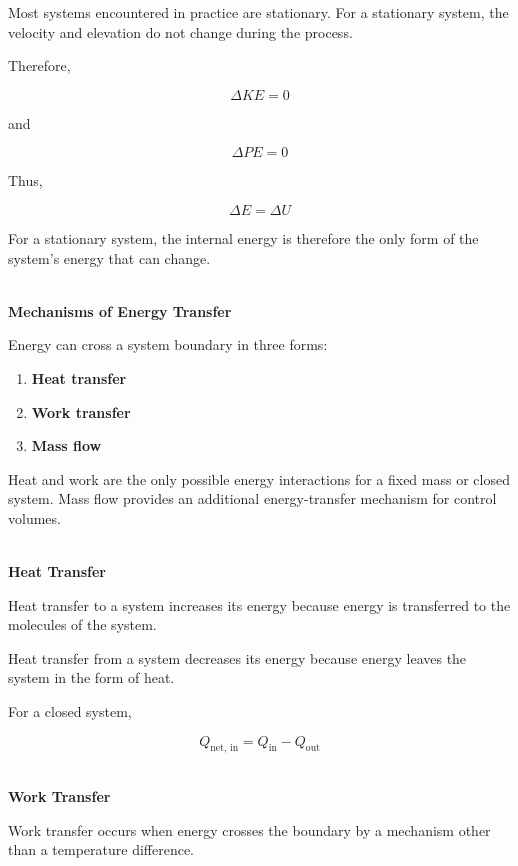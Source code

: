 \documentclass[12pt]{article}
\begin{document}
Most systems encountered in practice are stationary. For a stationary system, the velocity and elevation do not change during the process.

Therefore,

\begin{equation*}
\Delta KE=0
\end{equation*}

and

\begin{equation*}
\Delta PE=0
\end{equation*}

Thus,

\begin{equation*}
\Delta E=\Delta U
\end{equation*}

For a stationary system, the internal energy is therefore the only form of the system's energy that can change. 

\textbf{\\ Mechanisms of Energy Transfer}

Energy can cross a system boundary in three forms:

\begin{enumerate}
    \item \textbf{Heat transfer}
    \item \textbf{Work transfer}
    \item \textbf{Mass flow}
\end{enumerate}

Heat and work are the only possible energy interactions for a fixed mass or closed system. Mass flow provides an additional energy-transfer mechanism for control volumes. 

\textbf{\\ Heat Transfer}

Heat transfer to a system increases its energy because energy is transferred to the molecules of the system.

Heat transfer from a system decreases its energy because energy leaves the system in the form of heat.

For a closed system,

\begin{equation*}
Q_{\mathrm{net, \, in}}
=
Q_{\mathrm{in}}-Q_{\mathrm{out}}
\end{equation*}

\textbf{\\ Work Transfer}

Work transfer occurs when energy crosses the boundary by a mechanism other than a temperature difference.
\end{document}
